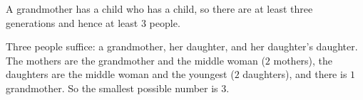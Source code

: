 A grandmother has a child who has a child, so there are at least three generations and hence at least $3$ people.

Three people suffice: a grandmother, her daughter, and her daughter's daughter. The mothers are the grandmother and the middle woman ($2$ mothers), the daughters are the middle woman and the youngest ($2$ daughters), and there is $1$ grandmother. So the smallest possible number is $\boxed{3}$.
